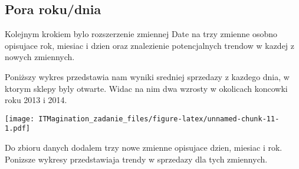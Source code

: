 \documentclass[]{article}
\newenvironment{Shaded}{\begin{snugshade}}{\end{snugshade}}
\newcommand{\DataTypeTok}[1]{\textcolor[rgb]{0.13,0.29,0.53}{#1}}
\newcommand{\DecValTok}[1]{\textcolor[rgb]{0.00,0.00,0.81}{#1}}
\newcommand{\KeywordTok}[1]{\textcolor[rgb]{0.13,0.29,0.53}{\textbf{#1}}}
\newcommand{\NormalTok}[1]{#1}
\newcommand{\OperatorTok}[1]{\textcolor[rgb]{0.81,0.36,0.00}{\textbf{#1}}}
\newcommand{\StringTok}[1]{\textcolor[rgb]{0.31,0.60,0.02}{#1}}
\begin{document}
\hypertarget{pora-rokudnia}{%
\subsection{Pora roku/dnia}\label{pora-rokudnia}}

Kolejnym krokiem bylo rozszerzenie zmiennej Date na trzy zmienne osobno
opisujace rok, miesiac i dzien oraz znalezienie potencjalnych trendow w
kazdej z nowych zmiennych.

Poniższy wykres przedstawia nam wyniki sredniej sprzedazy z kazdego
dnia, w ktorym sklepy byly otwarte. Widac na nim dwa wzrosty w okolicach
koncowki roku 2013 i 2014.

\begin{Shaded}
\end{Shaded}

\texttt{[image: ITMagination\_zadanie\_files/figure-latex/unnamed-chunk-11-1.pdf]}

Do zbioru danych dodalem trzy nowe zmienne opisujace dzien, miesiac i
rok. Ponizsze wykresy przedstawiaja trendy w sprzedazy dla tych
zmiennych.

\begin{Shaded}
\end{Shaded}
\end{document}
